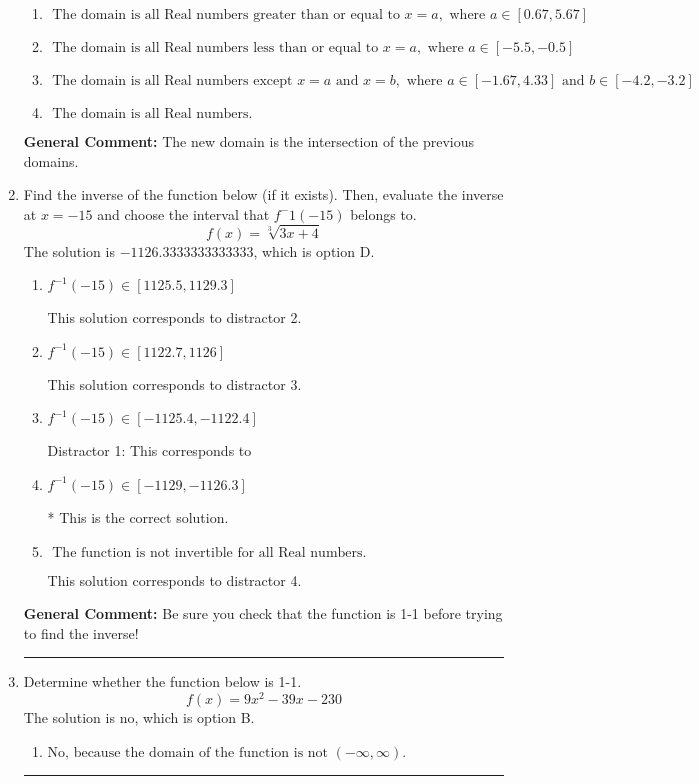 \documentclass{extbook}[14pt]
\newcommand{\litem}[1]{\item #1

\rule{\textwidth}{0.4pt}}
\begin{document}
\begin{enumerate}
{\begin{enumerate}[label=\Alph*.]
\item \( \text{ The domain is all Real numbers greater than or equal to } x = a, \text{ where } a \in [0.67, 5.67] \)


\item \( \text{ The domain is all Real numbers less than or equal to } x = a, \text{ where } a \in [-5.5, -0.5] \)


\item \( \text{ The domain is all Real numbers except } x = a \text{ and } x = b, \text{ where } a \in [-1.67, 4.33] \text{ and } b \in [-4.2, -3.2] \)


\item \( \text{ The domain is all Real numbers. } \)


\end{enumerate}

\textbf{General Comment:} The new domain is the intersection of the previous domains.
}
\litem{
Find the inverse of the function below (if it exists). Then, evaluate the inverse at $x = -15$ and choose the interval that $f^-1(-15)$ belongs to.
\[ f(x) = \sqrt[3]{3 x + 4} \]The solution is \( -1126.3333333333333 \), which is option D.\begin{enumerate}[label=\Alph*.]
\item \( f^{-1}(-15) \in [1125.5, 1129.3] \)

 This solution corresponds to distractor 2.
\item \( f^{-1}(-15) \in [1122.7, 1126] \)

 This solution corresponds to distractor 3.
\item \( f^{-1}(-15) \in [-1125.4, -1122.4] \)

 Distractor 1: This corresponds to 
\item \( f^{-1}(-15) \in [-1129, -1126.3] \)

* This is the correct solution.
\item \( \text{ The function is not invertible for all Real numbers. } \)

 This solution corresponds to distractor 4.
\end{enumerate}

\textbf{General Comment:} Be sure you check that the function is 1-1 before trying to find the inverse!
}
\litem{
Determine whether the function below is 1-1.
\[ f(x) = 9 x^2 - 39 x - 230 \]The solution is \( \text{no} \), which is option B.\begin{enumerate}[label=\Alph*.]
\item \( \text{No, because the domain of the function is not $(-\infty, \infty)$.} \)


\end{enumerate}}
\end{enumerate}
\end{document}
